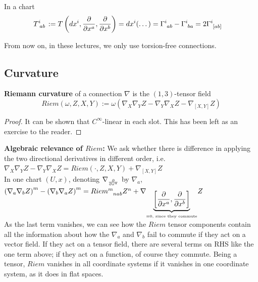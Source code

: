 In a chart 
\begin{align*}
  T\indices{^i_{ab}} := T\left(dx^i, \cibasis{x^a}, \cibasis{x^b}\right) & = dx^i (\dots) = \ccf{i}{ab} - \ccf{i}{ba} = 2 \ccf{i}{[ab]}
\end{align*}

From now on, in these lectures, we only use torsion-free connections. 

\subsection{Curvature}

\begin{definition}
  \textbf{Riemann curvature} of a connection $\nabla$ is the $(1,3)$-tensor field
\begin{equation}
  \boxed{Riem(\omega,Z,X,Y) := \omega(\nabla_X \nabla_Y Z - \nabla_Y \nabla_X Z - \nabla_{[X,Y]} Z)}
\end{equation}
\end{definition}
\begin{proof}
  It can be shown that $C^{\infty}$-linear in each slot. This has been left as an exercise to the reader.
\end{proof}

\textbf{Algebraic relevance of $Riem$:} We ask whether there is difference in applying the two directional derivatives in different order, i.e. \\
$\nabla_X \nabla_Y Z - \nabla_Y \nabla_X Z = Riem(\cdot,Z,X,Y) + \nabla_{[X,Y]} Z$ \\
In one chart $(U,x)$, denoting $\nabla_{\frac{\partial }{\partial x^a}}$ by $\nabla_a$, \\
$\left(\nabla_a \nabla_b Z \right)^m - \left(\nabla_b \nabla_a Z \right)^m = Riem\indices{^m_{nab}}Z^n + \nabla_{\underbrace{\left[\cibasis{x^a},\cibasis{x^b}\right]}_{=0,\text{ since they commute}}} Z$ \\
As the last term vanishes, we can see how the $Riem$ tensor components contain all the information about how the $\nabla_a$ and $\nabla_b$ fail to commute if they act on a vector field. If they act on a tensor field, there are several terms on RHS like the one term above; if they act on a function, of course they commute. Being a tensor, $Riem$ vanishes in all coordinate systems if it vanishes in one coordinate system, as it does in flat spaces.

